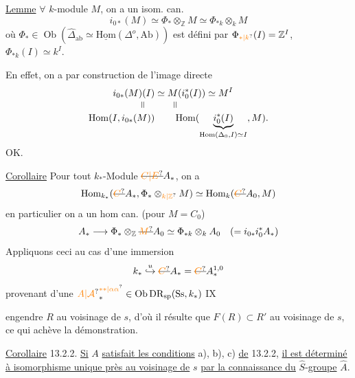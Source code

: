 \uline{Lemme} $\forall$ $k$-module $M$, on a un isom. can.
\[
 i_{0*}(M)\simeq\Phi_*\otimes_{\mathbb Z}M\simeq\Phi_{*k}\otimes_k M
\]
où $\Phi_*\in\operatorname{Ob}(\widehat\Delta_{\mathrm{ab}}\simeq\underline{\mathrm{Hom}}(\Delta^o,\mathrm{Ab}))$ est défini par $\Phi_{\unsure{*|k}}(I)=\mathbb Z^I$,  $\Phi_{*k}(I)\simeq k^I$.

En effet, on a par construction de l'image directe
\[
\begin{aligned}
i_{0*}(M)(I)&\simeq M(i_0^*(I))\simeq M^I\\[-2pt]
\rotatebox{90}{$=$}\quad&\qquad\rotatebox{90}{$=$}\\[-2pt]
\operatorname{Hom}(I,i_{0*}(M))&\qquad\operatorname{Hom}(\underbrace{i_0^*(I)}_{\operatorname{Hom}(\Delta_0,I)\simeq I},M).
\end{aligned}
\]
OK.


\uline{Corollaire} Pour tout $k_*$-Module $\deleted{\unsure{C|E}}A_*$, on a
\[
 \operatorname{Hom}_{k_*}(\deleted{\unsure{C}}A_*,\Phi_*\otimes_{\unsure{k|\mathbb Z}}M)\simeq\operatorname{Hom}_k(\deleted{\unsure{C}}A_0,M)
\]
en particulier on a un hom can. (pour $M=C_0$)
\[
 A_*\longrightarrow\Phi_*\otimes_{\mathbb Z}\deleted{\unsure{M}}A_0\simeq\Phi_{*k}\otimes_k A_0\quad(=i_{0*}i_0^*A_*)
\]
 Appliquons ceci au cas d'une immersion
\[
 k_*\overset{u}{\hookrightarrow}\deleted{\unsure{C}}A_*=\deleted{\unsure{C}}A_*^{1,0}
\]
provenant d'une $\unsure{A|\mathcal A}_*^{\unsure{**|\alpha\alpha}}\in\operatorname{Ob}\mathrm{DR}_{\mathrm{sp}}(\mathrm{Ss},k_*)$
\hfill IX

engendre $R$ au voisinage de $s$, d'où il résulte que $F(R)\subset R'$ au voisinage de $s$, ce qui achève la démonstration.

\uline{Corollaire} 13.2.2. \uline{Si} $A$ \uline{satisfait les conditions} a), b), c) \uline{de} 13.2.2, \uline{il est déterminé à isomorphisme unique près au voisinage de} $s$ \uline{par la connaissance du} $\hat S$-\uline{groupe} $\hat A$.


